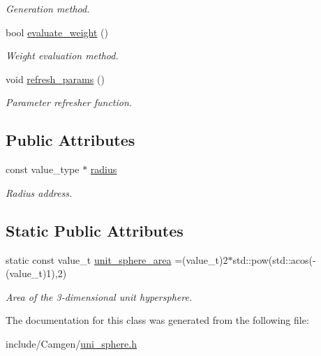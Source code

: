 \begin{DoxyCompactItemize}
\begin{DoxyCompactList}\small\item\em Generation method. \end{DoxyCompactList}\item 
\hypertarget{a00569_a0a21ab6d09dc949a36aeeeeebc83b781}{}bool \hyperlink{a00569_a0a21ab6d09dc949a36aeeeeebc83b781}{evaluate\+\_\+weight} ()\label{a00569_a0a21ab6d09dc949a36aeeeeebc83b781}

\begin{DoxyCompactList}\small\item\em Weight evaluation method. \end{DoxyCompactList}\item 
\hypertarget{a00569_a5dff10eb86ad281e5eee4a320f2f35a6}{}void \hyperlink{a00569_a5dff10eb86ad281e5eee4a320f2f35a6}{refresh\+\_\+params} ()\label{a00569_a5dff10eb86ad281e5eee4a320f2f35a6}

\begin{DoxyCompactList}\small\item\em Parameter refresher function. \end{DoxyCompactList}\end{DoxyCompactItemize}
\subsection*{Public Attributes}
\begin{DoxyCompactItemize}
\item 
\hypertarget{a00569_a5766eb62eabb613cae60461dd26caef5}{}const value\+\_\+type $\ast$ \hyperlink{a00569_a5766eb62eabb613cae60461dd26caef5}{radius}\label{a00569_a5766eb62eabb613cae60461dd26caef5}

\begin{DoxyCompactList}\small\item\em Radius address. \end{DoxyCompactList}\end{DoxyCompactItemize}
\subsection*{Static Public Attributes}
\begin{DoxyCompactItemize}
\item 
\hypertarget{a00569_a934f2a9ea8394e592aa3f97011cd234d}{}static const value\+\_\+t \hyperlink{a00569_a934f2a9ea8394e592aa3f97011cd234d}{unit\+\_\+sphere\+\_\+area} =(value\+\_\+t)2$\ast$std\+::pow(std\+::acos(-\/(value\+\_\+t)1),2)\label{a00569_a934f2a9ea8394e592aa3f97011cd234d}

\begin{DoxyCompactList}\small\item\em Area of the 3-\/dimensional unit hypersphere. \end{DoxyCompactList}\end{DoxyCompactItemize}


The documentation for this class was generated from the following file\+:\begin{DoxyCompactItemize}
\item 
include/\+Camgen/\hyperlink{a00822}{uni\+\_\+sphere.\+h}\end{DoxyCompactItemize}
